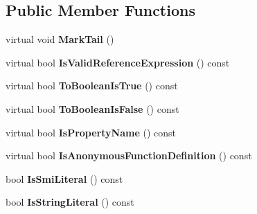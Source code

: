 \subsection*{Public Member Functions}
\begin{DoxyCompactItemize}
\item 
virtual void {\bfseries Mark\+Tail} ()\hypertarget{classv8_1_1internal_1_1_expression_af3b21545e3a75b74b58c8c4c96b83cf0}{}\label{classv8_1_1internal_1_1_expression_af3b21545e3a75b74b58c8c4c96b83cf0}

\item 
virtual bool {\bfseries Is\+Valid\+Reference\+Expression} () const \hypertarget{classv8_1_1internal_1_1_expression_aa55f2c783cd95bc83a5993f514b99b0f}{}\label{classv8_1_1internal_1_1_expression_aa55f2c783cd95bc83a5993f514b99b0f}

\item 
virtual bool {\bfseries To\+Boolean\+Is\+True} () const \hypertarget{classv8_1_1internal_1_1_expression_aaac1281d6505dd5b04859de4c68f99e5}{}\label{classv8_1_1internal_1_1_expression_aaac1281d6505dd5b04859de4c68f99e5}

\item 
virtual bool {\bfseries To\+Boolean\+Is\+False} () const \hypertarget{classv8_1_1internal_1_1_expression_a5fcd433a0f4cf5f91c50721e86efc62b}{}\label{classv8_1_1internal_1_1_expression_a5fcd433a0f4cf5f91c50721e86efc62b}

\item 
virtual bool {\bfseries Is\+Property\+Name} () const \hypertarget{classv8_1_1internal_1_1_expression_a2e652520da345dbe002e406fd235839b}{}\label{classv8_1_1internal_1_1_expression_a2e652520da345dbe002e406fd235839b}

\item 
virtual bool {\bfseries Is\+Anonymous\+Function\+Definition} () const \hypertarget{classv8_1_1internal_1_1_expression_a3a795d47bcbbcd73e530b08ed3264fe7}{}\label{classv8_1_1internal_1_1_expression_a3a795d47bcbbcd73e530b08ed3264fe7}

\item 
bool {\bfseries Is\+Smi\+Literal} () const \hypertarget{classv8_1_1internal_1_1_expression_aa57ffa44f31f9b27600f4e52ba9648db}{}\label{classv8_1_1internal_1_1_expression_aa57ffa44f31f9b27600f4e52ba9648db}

\item 
bool {\bfseries Is\+String\+Literal} () const \hypertarget{classv8_1_1internal_1_1_expression_a6b82dadf4112207b9f9ead42db8fb6f9}{}\label{classv8_1_1internal_1_1_expression_a6b82dadf4112207b9f9ead42db8fb6f9}


\end{DoxyCompactItemize}
